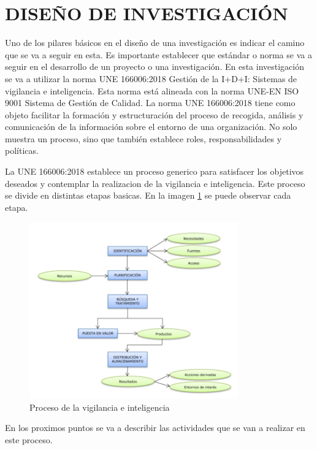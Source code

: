 \documentclass[spanish,12pt, a4paper,twoside]{paper}
\let\oldsection\section
\def\section{\cleardoublepage\oldsection}
\begin{document}
\section{DISEÑO DE INVESTIGACIÓN}
\justify
Uno de los pilares básicos en el diseño de una investigación es indicar el camino que se va a seguir en esta. Es importante establecer que estándar o norma se va a seguir en el desarrollo de un proyecto o una investigación. En esta investigación se va a utilizar la norma UNE 166006:2018 Gestión de la I+D+I: Sistemas de vigilancia e inteligencia. Esta norma está alineada con la norma UNE-EN ISO 9001 Sistema de Gestión de Calidad.
\justify
La norma UNE 166006:2018 tiene como objeto facilitar la formación y estructuración del proceso de recogida, análisis y comunicación de la información sobre el entorno de una organización. No solo muestra un proceso, sino que también establece roles, responsabilidades y políticas.

\justify 
La UNE 166006:2018 establece un proceso generico para satisfacer los objetivos deseados y contemplar la realizacion de la vigilancia e inteligencia. Este proceso se divide en distintas etapas basicas. En la imagen  \ref{fig:UNEsquema} se puede observar cada etapa.
\begin{figure}[h]
\centering
 \includegraphics[width=0.8\textwidth]{recursos/UNEEsquema}
\caption{Proceso de la vigilancia e inteligencia}
\label{fig:UNEsquema}
\end{figure}

\justify
En los proximos puntos se va a describir las actividades que se van a realizar en este proceso.
\end{document}
